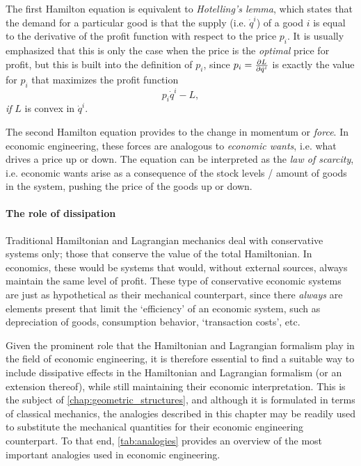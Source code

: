The first Hamilton equation is equivalent to \emph{Hotelling's lemma}, which states that the demand for a particular good is that the supply (i.e. $\dot{q}^i$) of a good $i$ is equal to the derivative of the profit function with respect to the price $p_i$. It is usually emphasized that this is only the case when the price is the \emph{optimal} price for profit, but this is built into the definition of $p_i$, since $p_i = \pdv{L}{\dot{q}^i}$ is exactly the value for $p_i$ that maximizes the profit function
$$ p_i\dot{q}^i - L, $$
\emph{if} $L$ is convex in $\dot{q}^i$.

The second Hamilton equation provides to the change in momentum or \emph{force}. In economic engineering, these forces are analogous to \emph{economic wants}, i.e. what drives a price up or down. The equation can be interpreted as the \emph{law of scarcity}, i.e. economic wants arise as a consequence of the stock levels / amount of goods in the system, pushing the price of the goods up or down.

\paragraph{The role of dissipation} Traditional Hamiltonian and Lagrangian mechanics deal with conservative systems only; those that conserve the value of the total Hamiltonian. In economics, these would be systems that would, without external sources, always maintain the same level of profit. These type of conservative economic systems are just as hypothetical as their mechanical counterpart, since there \emph{always} are elements present that limit the `efficiency' of an economic system, such as depreciation of goods, consumption behavior, `transaction costs', etc. 

Given the prominent role that the Hamiltonian and Lagrangian formalism play in the field of economic engineering, it is therefore essential to find a suitable way to include dissipative effects in the Hamiltonian and Lagrangian formalism (or an extension thereof), while still maintaining their economic interpretation. This is the subject of \cref{chap:geometric_structures}, and although it is formulated in terms of classical mechanics, the analogies described in this chapter may be readily used to substitute the mechanical quantities for their economic engineering counterpart. To that end, \cref{tab:analogies} provides an overview of the most important analogies used in economic engineering.

